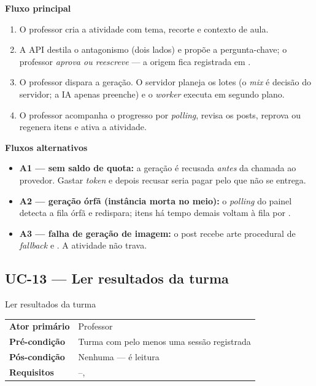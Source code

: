 \textbf{Fluxo principal}
\begin{enumerate}
  \item O professor cria a atividade com tema, recorte e contexto de aula.
  \item A API destila o antagonismo (dois lados) e propõe a pergunta-chave; o
    professor \emph{aprova ou reescreve} --- a origem fica registrada em
    .
  \item O professor dispara a geração. O servidor planeja os lotes (o
    \emph{mix} é decisão do servidor; a IA apenas preenche) e o \emph{worker}
    executa em segundo plano.
  \item O professor acompanha o progresso por \emph{polling}, revisa os posts,
    reprova ou regenera itens e ativa a atividade.
\end{enumerate}

\textbf{Fluxos alternativos}
\begin{itemize}
  \item \textbf{A1 --- sem saldo de quota:} a geração é recusada \emph{antes} da
    chamada ao provedor. Gastar \emph{token} e depois recusar seria pagar pelo
    que não se entrega.
  \item \textbf{A2 --- geração órfã (instância morta no meio):} o
    \emph{polling} do painel detecta a fila órfã e redispara; itens
     há tempo demais voltam à fila por .
  \item \textbf{A3 --- falha de geração de imagem:} o post recebe arte
    procedural de \emph{fallback} e . A atividade
    não trava.
\end{itemize}

\subsection{UC-13 --- Ler resultados da turma}

\begin{especificacao}{ Ler resultados da turma}
\begin{tabularx}{\linewidth}{@{}L{28mm}X@{}}
\textbf{Ator primário} & Professor\\
\textbf{Pré-condição} & Turma com pelo menos uma sessão registrada\\
\textbf{Pós-condição} & Nenhuma --- é leitura\\
\textbf{Requisitos} & --, \\
\end{tabularx}
\end{especificacao}

